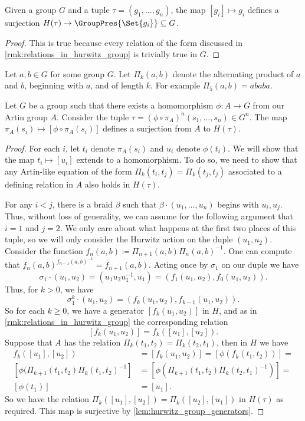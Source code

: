 \begin{lemma}
	\label{lem:hurwitz_to_G_homomorphism}
	Given a group $G$ and a tuple $\tau = (g_1,\ldots,g_n)$, the map $[g_i] \mapsto g_i$ defines a surjection $H(\tau) \to \GroupPres{\Set{g_i}} \subseteq  G$.
\end{lemma}
\begin{proof}
	This is true because every relation of the form discussed in \cref{rmk:relations_in_hurwitz_group} is trivially true in  $G$.
\end{proof}

Let $a,b \in G$ for some group  $G$.
Let $\Pi_k(a,b)$ denote the alternating product of $a$ and  $b$, beginning with $a$, and of length  $k$.
For example  $\Pi_5(a,b)=ababa$.
\begin{lemma}
	\label{lem:artin_to_hurwitz_surjection}
	Let $G$ be a group such that there exists a homomorphism $\phi \colon A \to G$ from our Artin group $A$.
	Consider the tuple $\tau = (\phi \circ \pi_A)^n(s_1,\ldots,s_n) \in G^n$.
	The map $\pi_A(s_i) \mapsto [\phi\circ\pi_A(s_i)]$ defines a surjection from $A$ to $H(\tau)$.
\end{lemma}
\begin{proof}
	For each $i$, let $t_i$ denote  $\pi_A(s_i)$ and  $u_i$ denote  $\phi(t_i)$.
	We will show that the map $t_i \mapsto [u_i]$ extends to a homomorphism.
	To do so, we need to show that any Artin-like equation of the form $\Pi_k(t_i,t_j) = \Pi_k(t_j,t_j)$ associated to a defining relation in $A$ also holds in $H(\tau)$.

	For any $i < j$, there is a braid $\beta$ such that  $\beta \cdot (u_1,\ldots,u_n)$ begins with $u_i,u_j$.
	Thus, without loss of generality, we can assume for the following argument that $i=1$ and  $j=2$.
	We only care about what happens at the first two places of this tuple, so we will only consider the Hurwitz action on the duple $(u_1,u_2)$.
	Consider the function $f_n(a,b) \coloneq \Pi_{n+1}(a,b)\Pi_n(a,b)^{-1} $.
	One can compute that $f_n(a,b)^{f_{n-1}(a,b)^{-1}}=f_{n+1}(a,b)$.
	Acting once by $\sigma_1$ on our duple we have
	\[
		\sigma_1 \cdot (u_1,u_2) = (u_1u_2u_1^{-1},u_1) = (f_1(u_1,u_2),f_0(u_1,u_2))
		.\]
	Thus, for $k>0$, we have
	\[
		\sigma_1^k \cdot (u_1,u_2) = (f_{k}(u_1,u_2),f_{k-1}(u_1,u_2))
		.\]
	So for each $k \geq 0$, we have a generator $[f_k(u_1,u_2)]$ in $H$, and as in \cref{rmk:relations_in_hurwitz_group} the corresponding relation
	\[
		[f_k(u_1,u_2)]=f_k([u_1],[u_2])
		.\]
	Suppose that $A$ has the relation  $\Pi_k(t_1,t_2)=\Pi_k(t_2,t_1)$, then in $H$ we have
	\begin{align*}
		f_k([u_1],[u_2])                               & = [f_k(u_1,u_2)] =  [\phi(f_k(t_1,t_2))] =                     \\
		[\phi(\Pi_{k+1}(t_1,t_2)\Pi_{k}(t_1,t_2)^{-1}] & = [\phi\left(\Pi_{k+1}(t_1,t_2)\Pi_{k}(t_2,t_1)^{-1}\right)] = \\
		[\phi(t_1)]                                    & = [u_1]
		.\end{align*}
	So we have the relation $\Pi_{k}([u_1],[u_2]) = \Pi_k([u_2],[u_1])$ in $H(\tau)$ as required.
	This map is surjective by \cref{lem:hurwitz_group_generators}.
\end{proof}

